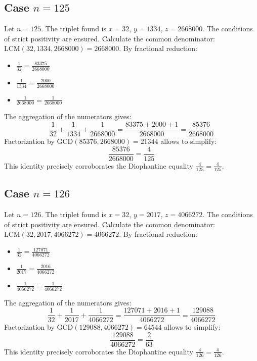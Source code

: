 \documentclass[11pt,a4paper]{article}
\begin{document}
\subsection{Case $n = 125$}
Let $n = 125$. The triplet found is $x = 32$, $y = 1334$, $z = 2668000$.
The conditions of strict positivity are ensured.
Calculate the common denominator: $\text{LCM}(32, 1334, 2668000) = 2668000$.
By fractional reduction:
\begin{itemize}
    \item $\frac{1}{32} = \frac{83375}{2668000}$
    \item $\frac{1}{1334} = \frac{2000}{2668000}$
    \item $\frac{1}{2668000} = \frac{1}{2668000}$
\end{itemize}
The aggregation of the numerators gives:
$$ \frac{1}{32} + \frac{1}{1334} + \frac{1}{2668000} = \frac{83375 + 2000 + 1}{2668000} = \frac{85376}{2668000} $$
Factorization by $\text{GCD}(85376, 2668000) = 21344$ allows to simplify:
$$ \frac{85376}{2668000} = \frac{4}{125} $$
This identity precisely corroborates the Diophantine equality $\frac{4}{125} = \frac{4}{125}$.

\subsection{Case $n = 126$}
Let $n = 126$. The triplet found is $x = 32$, $y = 2017$, $z = 4066272$.
The conditions of strict positivity are ensured.
Calculate the common denominator: $\text{LCM}(32, 2017, 4066272) = 4066272$.
By fractional reduction:
\begin{itemize}
    \item $\frac{1}{32} = \frac{127071}{4066272}$
    \item $\frac{1}{2017} = \frac{2016}{4066272}$
    \item $\frac{1}{4066272} = \frac{1}{4066272}$
\end{itemize}
The aggregation of the numerators gives:
$$ \frac{1}{32} + \frac{1}{2017} + \frac{1}{4066272} = \frac{127071 + 2016 + 1}{4066272} = \frac{129088}{4066272} $$
Factorization by $\text{GCD}(129088, 4066272) = 64544$ allows to simplify:
$$ \frac{129088}{4066272} = \frac{2}{63} $$
This identity precisely corroborates the Diophantine equality $\frac{4}{126} = \frac{4}{126}$.
\end{document}
